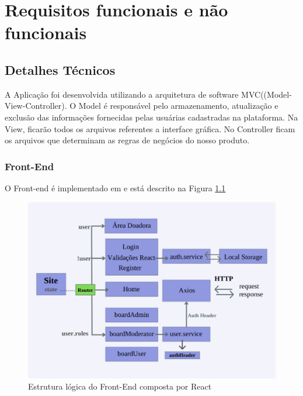 \chapter{Requisitos funcionais e não funcionais}
\section{Detalhes Técnicos}
\label{sec:tech}

A Aplicação foi desenvolvida utilizando a arquitetura de software MVC((Model-View-Controller).
O Model é responsável pelo armazenamento, atualização e exclusão das informações fornecidas pelas usuárias cadastradas na plataforma.
Na View, ficarão todos os arquivos referentes a interface gráfica.
No Controller ficam os arquivos que determinam as regras de negócios do nosso produto.

\subsection{Front-End}
O Front-end é implementado em \cite{React} e está descrito na Figura \ref{fig:logicFront}

\begin{figure}[h!]
    \centering
    \includegraphics[width=1.0\textwidth]{Figuras/Frontpdf.pdf}
    \caption{Estrutura lógica do Front-End composta por React}
    \label{fig:logicFront}
\end{figure}

